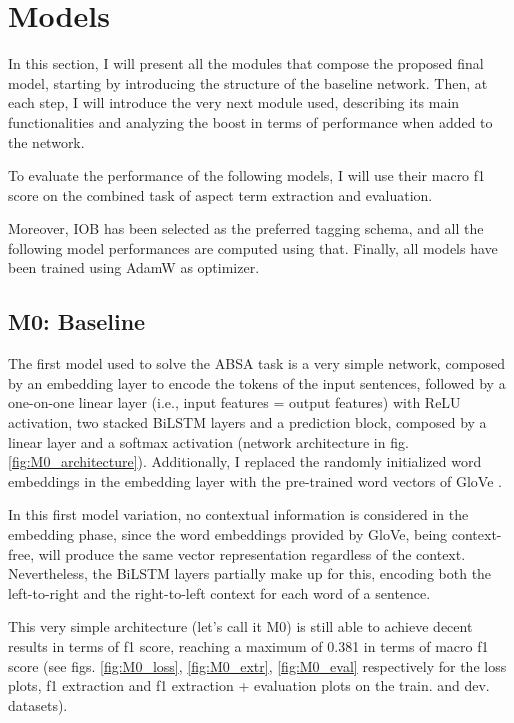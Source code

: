 \documentclass[11pt,a4paper]{article}
\begin{document}
	\section{Models}
	In this section, I will present all the modules that compose the proposed final
	model, starting by introducing the structure of the baseline network. Then, at
	each step, I will introduce the very next module used, describing its main
	functionalities and analyzing the boost in terms of performance when added to
	the network.
	
	To evaluate the performance of the following models, I will use their macro f1
	score on the combined task of aspect term extraction and evaluation.
	
	Moreover, IOB has been selected as the preferred tagging schema, and all the
	following model performances are computed using that. Finally, all models have
	been trained using AdamW as optimizer.
	
	\subsection{M0: Baseline}
	The first model used to solve the ABSA task is a very simple network, composed
	by an embedding layer to encode the tokens of the input sentences, followed by a
	one-on-one linear layer (i.e., input features = output features) with ReLU activation, two
	stacked BiLSTM layers and a prediction block, composed by a linear layer and a
	softmax activation (network architecture in fig. \ref{fig:M0_architecture}).
	Additionally, I replaced the randomly initialized word embeddings in the
	embedding layer with the pre-trained word vectors of GloVe
	\citep{pennington2014glove}.
	
	In this first model variation, no contextual information is considered in the
	embedding phase, since the word embeddings provided by GloVe, being
	context-free, will produce the same vector representation regardless of the
	context. Nevertheless, the BiLSTM layers partially make up for this, encoding
	both the left-to-right and the right-to-left context for each word of a
	sentence.
	
	This very simple architecture (let's call it M0) is still able to achieve
	decent results in terms of f1 score, reaching a maximum of 0.381 in terms of
	macro f1 score (see figs. \ref{fig:M0_loss}, \ref{fig:M0_extr},
	\ref{fig:M0_eval} respectively for the loss plots, f1 extraction and f1
	extraction + evaluation plots on the train. and dev. datasets).
	
\end{document}
